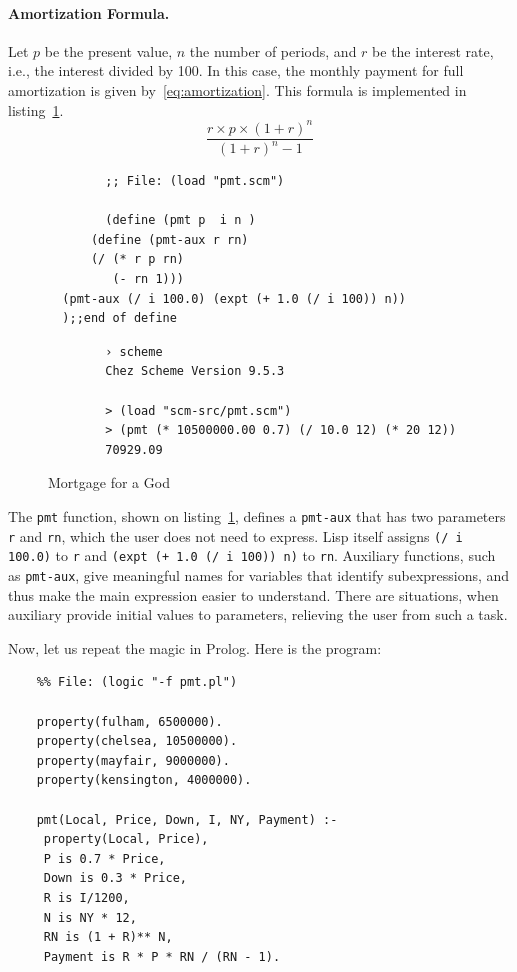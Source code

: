 \documentclass[a4paper,12pt]{book}
\newenvironment{fmpage}[1]
{\begin{lrbox}{\fmbox}\begin{minipage}{#1}}
{\end{minipage}\end{lrbox}\fbox{\usebox{\fmbox}}}
\begin{document}
\paragraph{Amortization Formula.} Let $p$ be the
present value, $n$ the number of periods,
and $r$ be the
interest rate, i.e., the interest divided by 100.
In this case, the monthly payment for full
amortization is given by~\ref{eq:amortization}.
This formula is implemented in
listing~\ref{Pan:mortgage}.
\begin{equation}
	\frac{r\times p\times(1+r)^n}{(1+r)^n - 1}
	\label{eq:amortization}
\end{equation}

\begin{figure}[!h]
	\begin{fmpage}{0.9\textwidth}
		\begin{verbatim}
		;; File: (load "pmt.scm")

		(define (pmt p  i n )
      (define (pmt-aux r rn)
	  (/ (* r p rn)
	     (- rn 1)))
  (pmt-aux (/ i 100.0) (expt (+ 1.0 (/ i 100)) n))
  );;end of define
		\end{verbatim}
	\end{fmpage}

	\begin{fmpage}{0.9\textwidth}
		\begin{verbatim}
		› scheme
		Chez Scheme Version 9.5.3

		> (load "scm-src/pmt.scm")
		> (pmt (* 10500000.00 0.7) (/ 10.0 12) (* 20 12))
		70929.09
		\end{verbatim}
	\end{fmpage}
	\caption{Mortgage for a God}
	\label{Pan:mortgage}
\end{figure}

The \verb|pmt| function, shown on listing~\ref{Pan:mortgage},
defines a \verb|pmt-aux| that has two parameters \verb|r| and
\verb|rn|, which the user does not need to express.
Lisp itself assigns \verb|(/ i 100.0)| to \verb|r| and
\verb|(expt (+ 1.0 (/ i 100)) n)| to \verb|rn|. Auxiliary
functions, such as \verb|pmt-aux|, give meaningful names
for variables that identify subexpressions, and thus make
the main expression easier to understand. There are situations,
when auxiliary provide initial values to parameters, relieving
the user from such a task.

Now, let us repeat the magic in Prolog. Here is the program:\\

\begin{fmpage}{0.9\textwidth}
	\begin{verbatim}
	%% File: (logic "-f pmt.pl")

	property(fulham, 6500000).
	property(chelsea, 10500000).
	property(mayfair, 9000000).
	property(kensington, 4000000).

	pmt(Local, Price, Down, I, NY, Payment) :-
     property(Local, Price),
     P is 0.7 * Price,
     Down is 0.3 * Price,
     R is I/1200,
     N is NY * 12,
     RN is (1 + R)** N,
     Payment is R * P * RN / (RN - 1).
	\end{verbatim}
\end{fmpage}
\end{document}
